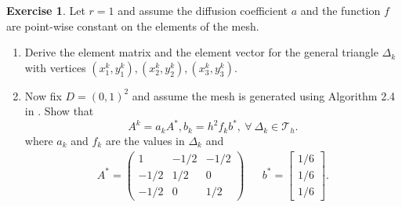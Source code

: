 \documentclass{amsart}
\theoremstyle{plain}
\theoremstyle{definition}
\newtheorem{exer}{Exercise}[section]
\begin{document}
\begin{exer}
Let $r=1$ and assume the diffusion coefficient $a$ and the function $f$ are point-wise constant on the elements of the mesh.
\begin{enumerate}[label=\alph*.]
    \item Derive the element matrix and the element vector for the general triangle $\Delta_k$ with vertices $(x_1^k,y_1^k),(x_2^k,y_2^k),(x_3^k,y_3^k).$
    \item Now fix $D=(0,1)^2$ and assume the mesh is generated using Algorithm 2.4 in \cite{lord2014introduction}. Show that
    $$A^k=a_k A^*, b_k= h^2 f_k b^*, \ \forall \ \Delta_k \in \mathcal{T}_h.$$
    where $a_k$ and $f_k$ are the values in $\Delta_k$ and 
    \begin{align*}
        A^* =\begin{pmatrix}
            1 & -1/2 & -1/2\\
            -1/2 & 1/2 & 0\\
            -1/2 & 0 &1/2
        \end{pmatrix} && b^* = \begin{bmatrix}
            1/6\\1/6\\1/6
        \end{bmatrix}.
    \end{align*}
\end{enumerate}
    
\end{exer}
\end{document}
